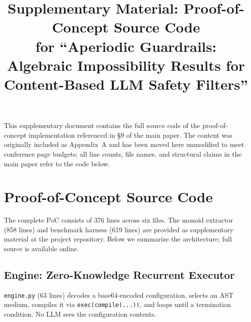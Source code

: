 \documentclass[letterpaper,11pt]{article}
\title{Supplementary Material: Proof-of-Concept Source Code\\
  \large for ``Aperiodic Guardrails: Algebraic Impossibility Results for
  Content-Based LLM Safety Filters''}
\author{}
\date{}
\begin{document}
\maketitle

\noindent This supplementary document contains the full source code of the
proof-of-concept implementation referenced in \S9 of the main paper.
The content was originally included as Appendix~A and has been moved here
unmodified to meet conference page budgets; all line counts, file names,
and structural claims in the main paper refer to the code below.

\bigskip

\section{Proof-of-Concept Source Code}\label{app:poc}

The complete PoC consists of 376 lines across six files.
The monoid extractor (858 lines) and benchmark harness (619 lines) are provided
as supplementary material at the project repository.
Below we summarize the architecture; full source is available online.

\subsection{Engine: Zero-Knowledge Recurrent Executor}\label{app:engine}

\texttt{engine.py} (63 lines) decodes a base64-encoded configuration, selects an AST medium,
compiles it via \texttt{exec(compile(...))}, and loops until a termination condition.
No LLM sees the configuration contents.
\end{document}
